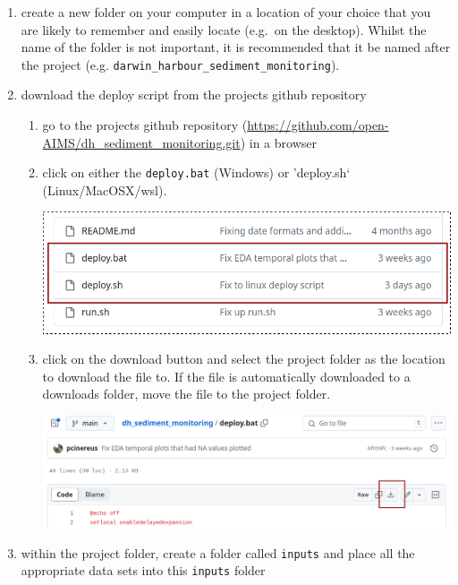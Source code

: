 \documentclass[
  8pt,
  a4paper]{article}
\begin{document}
\begin{enumerate}
\def\labelenumi{\arabic{enumi}.}
\item
  create a new folder on your computer in a location of your choice that
  you are likely to remember and easily locate (e.g.~on the desktop).
  Whilst the name of the folder is not important, it is recommended that
  it be named after the project (e.g.
  \texttt{darwin\_harbour\_sediment\_monitoring}).
\item
  download the deploy script from the projects github repository

  \begin{enumerate}
  \def\labelenumii{\alph{enumii}.}
  \item
    go to the projects github repository
    (\url{https://github.com/open-AIMS/dh_sediment_monitoring.git}) in a
    browser
  \item
    click on either the \texttt{deploy.bat} (Windows) or 'deploy.sh`
    (Linux/MacOSX/wsl).

    \includegraphics{resources/github_deploy_script.png}
  \item
    click on the download button and select the project folder as the
    location to download the file to. If the file is automatically
    downloaded to a downloads folder, move the file to the project
    folder.

    \includegraphics{resources/github_deploy_script2.png}
  \end{enumerate}
\item
  within the project folder, create a folder called \texttt{inputs} and
  place all the appropriate data sets into this \texttt{inputs} folder
\end{enumerate}
\end{document}
